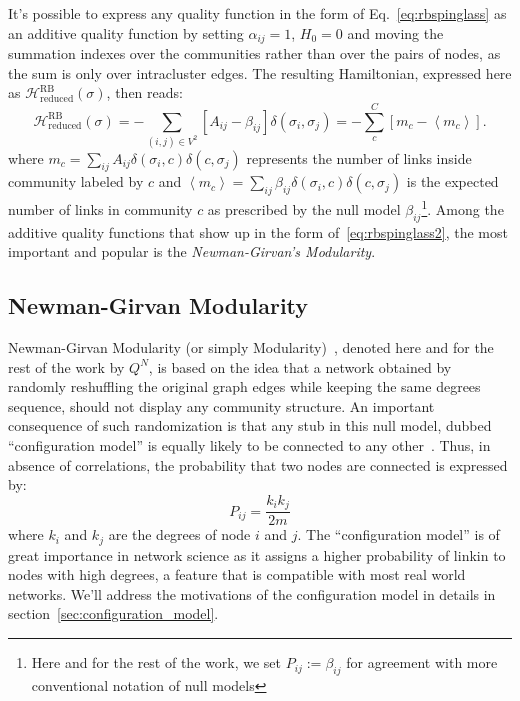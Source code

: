 It's possible to express any quality function in the form of Eq.~\ref{eq:rbspinglass} as an additive quality function by setting $\alpha_{ij}=1$, $H_0=0$ and moving the summation indexes over the communities rather than over the pairs of nodes, as the sum is only over intracluster edges. The resulting Hamiltonian, expressed here as $\mathcal{H}^{\textrm{RB}}_{\textrm{reduced}}(\sigma)$, then reads:
\begin{equation}\label{eq:rbspinglass2}
\mathcal{H}^{\textrm{RB}}_{\textrm{reduced}}(\sigma) = -\sum_{(i,j) \in V^2} \left[ A_{ij} - \beta_{ij} \right] \delta(\sigma_i,\sigma_j) = - \sum \limits_{c}^C \left[ m_c - \left< m_c \right> \right].
\end{equation}
where $m_c=\sum_{ij}A_{ij}\delta(\sigma_i,c)\delta(c,\sigma_j)$ represents the number of links inside community labeled by $c$ and $\left <m_c \right >=\sum_{ij}\beta_{ij}\delta(\sigma_i,c)\delta(c,\sigma_j)$ is the expected number of links in community $c$ as prescribed by the null model $\beta_{ij}$\footnote{Here and for the rest of the work, we set $P_{ij}:=\beta_{ij}$ for agreement with more conventional notation of null models}. 
Among the additive quality functions that show up in the form of~\ref{eq:rbspinglass2}, the most important and popular is the \emph{Newman-Girvan's Modularity}.

\subsection{Newman-Girvan Modularity}\label{sec:newman_modularity}
Newman-Girvan Modularity (or simply Modularity)~\cite{newman2006}, denoted here and for the rest of the work by $Q^N$, is based on the idea that a network obtained by randomly reshuffling the original graph edges while keeping the same degrees sequence, should not display any community structure. 
An important consequence of such randomization is that any stub in this null model, dubbed ``configuration model'' is equally likely to be connected to any other~\cite{newman2010networks}. Thus, in absence of correlations, the probability that two nodes are connected is expressed by:
\begin{equation}\label{eq:configuration_model}
P_{ij} = \frac{k_i k_j}{2m}
\end{equation}
where $k_i$ and $k_j$ are the degrees of node $i$ and $j$. The ``configuration model''  is of great importance in network science as it assigns a higher probability of linkin to nodes with high degrees, a feature that is compatible with most real world networks. 
We'll address the motivations of the configuration model in details in section~\ref{sec:configuration_model}.


